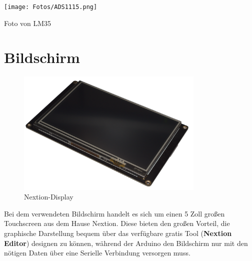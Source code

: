 \begin{minipage}{8cm}
    \centering
    \texttt{[image: Fotos/ADS1115.png]}
\end{minipage}
\begin{minipage}{8cm}
    Foto von LM35
\end{minipage}
\newpage
\section{Bildschirm}
\begin{figure}[h]
    \includegraphics[width=0.8\textwidth]{Fotos/Nextion_Display.png}
    \caption{Nextion-Display}
\end{figure}
Bei dem verwendeten Bildschirm handelt es sich um einen 5 Zoll großen Touchscreen aus dem Hause Nextion.
Diese bieten den großen Vorteil, die graphische Darstellung bequem über das verfügbare gratis Tool (\textbf{Nextion Editor}) designen zu können, während der Arduino den Bildschirm nur mit den nötigen Daten über eine Serielle Verbindung versorgen muss. 
